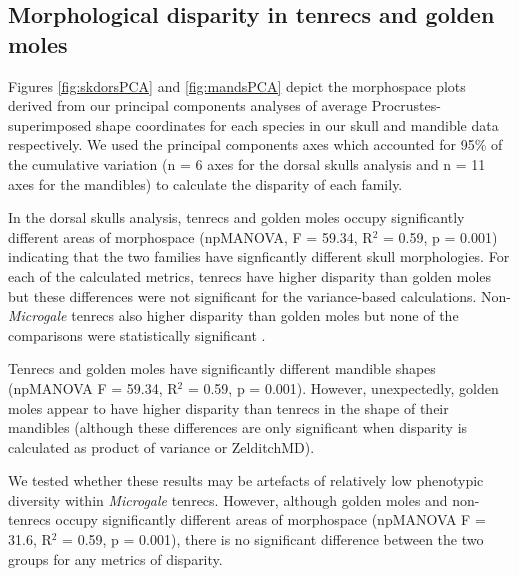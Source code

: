 \documentclass[12pt,a4paper]{article}
\begin{document}

\subsection{Morphological disparity in tenrecs and golden moles} 
 
Figures  \ref{fig:skdorsPCA} and \ref{fig:mandsPCA} 
depict the morphospace plots derived from our principal components analyses of average Procrustes-superimposed shape coordinates for each species in our skull and mandible data respectively. We used the principal components axes which accounted for 95\% of the cumulative variation (n = 6 axes for the dorsal skulls analysis and n = 11 axes for the mandibles) to calculate the disparity of each family. 

In the dorsal skulls analysis, tenrecs and golden moles occupy significantly different areas of morphospace (npMANOVA, F = 59.34, R$^2 $ = 0.59, p = 0.001) indicating that the two families have signficantly different skull morphologies. 
For each of the calculated metrics, tenrecs have higher disparity than golden moles but these differences were not significant for the variance-based calculations.  
Non-\textit{Microgale} tenrecs also higher disparity than golden moles but none of the comparisons were statistically significant .

Tenrecs and golden moles have significantly different mandible shapes (npMANOVA F = 59.34, R$^2$ = 0.59, p = 0.001). However, unexpectedly, golden moles appear to have higher disparity than tenrecs in the shape of their mandibles (although these differences are only significant when disparity is calculated as product of variance or ZelditchMD). 

We tested whether these results may be artefacts of relatively low phenotypic diversity within \textit{Microgale} tenrecs. However, although golden moles and non- tenrecs occupy significantly different areas of morphospace (npMANOVA F = 31.6, R$^2$ = 0.59, p =	0.001), there is no significant difference between the two groups for any metrics of disparity. %
\end{document}

